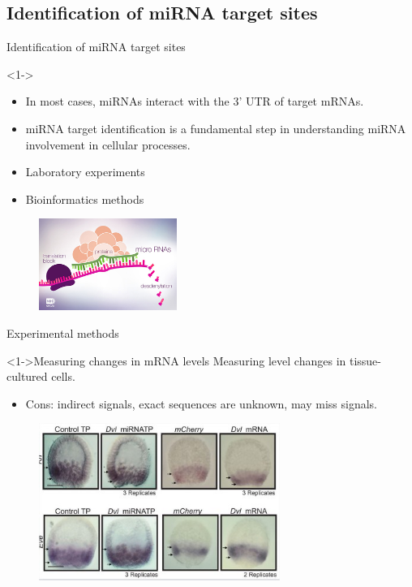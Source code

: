 \documentclass{beamer}
\begin{document}
\subsection{Identification of miRNA target sites}
\begin{frame}{Identification of miRNA target sites}
\begin{exampleblock}
		<1->{}
	\begin{itemize}
\item In most cases, miRNAs interact with the 3' UTR of target mRNAs. 
\item miRNA target identification is a fundamental step in understanding miRNA involvement in cellular processes.
\end{itemize}
	\end{exampleblock}
	\begin{itemize}
	\item Laboratory experiments
	\item Bioinformatics methods
\end{itemize}
\begin{figure}[ht!]
	  \centering
    \includegraphics[width=0.4\textwidth]{images/micro_rna2910516058.jpg} 
\end{figure}
\end{frame}



\begin{frame}{Experimental methods}
		\begin{exampleblock}
			<1->{Measuring changes in mRNA levels}
			Measuring level changes in tissue-cultured cells.
			\begin{itemize}
				\item Cons: indirect signals, exact sequences are unknown, may miss signals.
			\end{itemize}
		\end{exampleblock}
		\begin{figure}[ht!]
	  \centering
    \includegraphics[width=0.7\textwidth]{images/mrna measure.jpg}
\end{figure}
	
\end{frame}
\end{document}
